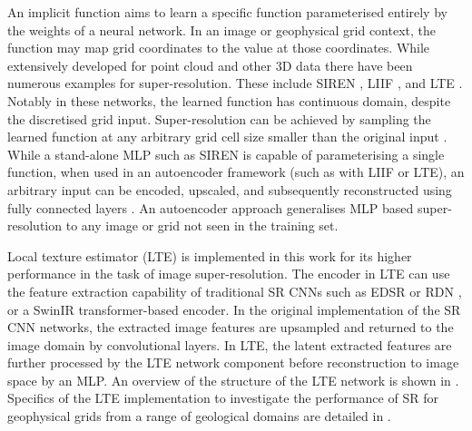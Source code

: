An implicit function aims to learn a specific function parameterised entirely by the weights of a neural network.
In an image or geophysical grid context, the function may map grid coordinates to the value at those coordinates.
While extensively developed for point cloud and other 3D data \parencite[e.g.][]{jiangLocalImplicitGrid2020} there have been numerous examples for super-resolution.
These include SIREN \parencite{sitzmann2019siren}, LIIF \parencite{chenLearningContinuousImage2021}, and LTE \parencite{leeLocalTextureEstimator2022}.
Notably in these networks, the learned function has continuous domain, despite the discretised grid input.
Super-resolution can be achieved by sampling the learned function at any arbitrary grid cell size smaller than the original input \parencite{chenLearningContinuousImage2021}.
While a stand-alone MLP such as SIREN is capable of parameterising a single function, when used in an autoencoder framework (such as with LIIF or LTE), an arbitrary input can be encoded, upscaled, and subsequently reconstructed using fully connected layers .
An autoencoder approach generalises MLP based super-resolution to any image or grid not seen in the training set.

Local texture estimator (LTE) \parencite{leeLocalTextureEstimator2022} is implemented in this work for its higher performance in the task of image super-resolution.
The encoder in LTE can use the feature extraction capability of traditional SR CNNs such as EDSR \parencite{limEnhancedDeepResidual2017} or RDN \parencite{zhangResidualDenseNetwork2018}, or a SwinIR \parencite{liangSwinIRImageRestoration2021} transformer-based encoder.
In the original implementation of the SR CNN networks, the extracted image features are upsampled and returned to the image domain by convolutional layers.
In LTE, the latent extracted features are further processed by the LTE network component before reconstruction to image space by an MLP\@.
An overview of the structure of the LTE network is shown in .
Specifics of the LTE implementation to investigate the performance of SR for geophysical grids from a range of geological domains are detailed in .

